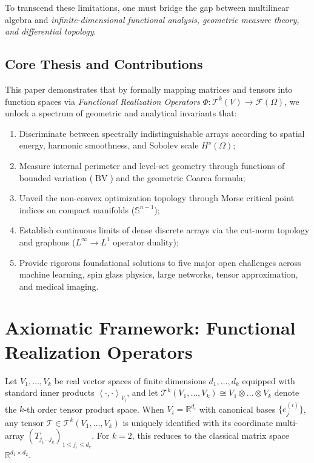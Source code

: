 \documentclass[11pt,a4paper,reqno]{amsart}
\theoremstyle{definition}
\numberwithin{equation}{section}
\providecommand{\R}{\mathbb{R}}
\providecommand{\Sph}{\mathbb{S}}
\providecommand{\BV}{\operatorname{BV}}
\newcommand{\inner}[2]{\left\langle #1, #2 \right\rangle}
\providecommand{\Sph}{\mathbb{S}}
\providecommand{\R}{\mathbb{R}}
\providecommand{\BV}{\mathrm{BV}}
\begin{document}
To transcend these limitations, one must bridge the gap between multilinear algebra and \emph{infinite-dimensional functional analysis, geometric measure theory, and differential topology}. 

\subsection*{Core Thesis and Contributions}
This paper demonstrates that by formally mapping matrices and tensors into function spaces via \emph{Functional Realization Operators} $\Phi \colon \mathcal{T}^k(V) \to \mathcal{F}(\Omega)$, we unlock a spectrum of geometric and analytical invariants that:
\begin{enumerate}[label=\arabic*.]
    \item Discriminate between spectrally indistinguishable arrays according to spatial energy, harmonic smoothness, and Sobolev scale $H^s(\Omega)$;
    \item Measure internal perimeter and level-set geometry through functions of bounded variation ($\BV$) and the geometric Coarea formula;
    \item Unveil the non-convex optimization topology through Morse critical point indices on compact manifolds ($\Sph^{n-1}$);
    \item Establish continuous limits of dense discrete arrays via the cut-norm topology and graphons ($L^\infty \to L^1$ operator duality);
    \item Provide rigorous foundational solutions to five major open challenges across machine learning, spin glass physics, large networks, tensor approximation, and medical imaging.
\end{enumerate}

\section{Axiomatic Framework: Functional Realization Operators}
\label{sec:framework}

Let $V_1, \dots, V_k$ be real vector spaces of finite dimensions $d_1, \dots, d_k$ equipped with standard inner products $\inner{\cdot}{\cdot}_{V_i}$, and let $\mathcal{T}^k(V_1, \dots, V_k) \cong V_1 \otimes \dots \otimes V_k$ denote the $k$-th order tensor product space. When $V_i = \R^{d_i}$ with canonical bases $\{e_{j}^{(i)}\}$, any tensor $\mathcal{T} \in \mathcal{T}^k(V_1, \dots, V_k)$ is uniquely identified with its coordinate multi-array $(T_{j_1 \dots j_k})_{1 \le j_r \le d_r}$. For $k=2$, this reduces to the classical matrix space $\R^{d_1 \times d_2}$.
\end{document}
